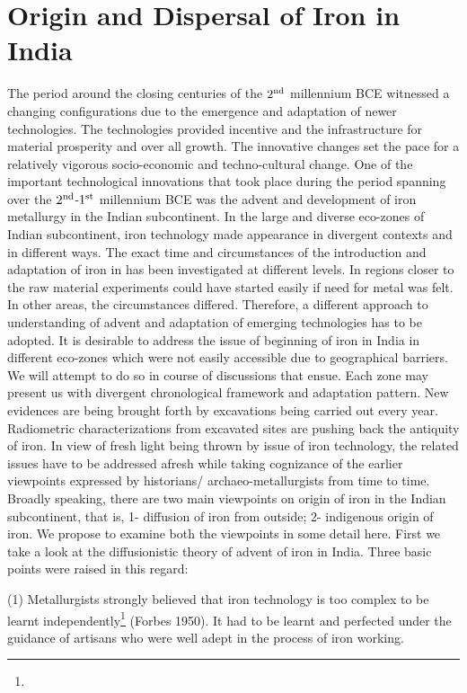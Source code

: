 \chapter{Origin and Dispersal of Iron in India}\label{chapter3}

The period around the closing centuries of the $2^{\rm nd}$ millennium BCE witnessed a changing configurations due to the emergence and adaptation of newer technologies. The technologies provided incentive and the infrastructure for material prosperity and over all growth. The innovative changes set the pace for a relatively vigorous socio-economic and techno-cultural change. One of the important technological innovations that took place during the period spanning over the $2^{\rm nd}$-$1^{\rm st}$ millennium BCE was the advent and development of iron metallurgy in the Indian subcontinent. In the large and diverse eco-zones of Indian subcontinent, iron technology made appearance in divergent contexts and in different ways. The exact time and circumstances of the introduction and adaptation of iron in has been investigated at different levels. In regions closer to the raw material experiments could have started easily if need for metal was felt. In other areas, the circumstances differed. Therefore, a different approach to understanding of advent and adaptation of emerging technologies has to be adopted. It is desirable to address the issue of beginning of iron in India in different eco-zones which were not easily accessible due to geographical barriers. We will attempt to do so in course of discussions that ensue. Each zone may present us with divergent chronological framework and adaptation pattern. New evidences are being brought forth by excavations being carried out every year. Radiometric characterizations from excavated sites are pushing back the antiquity of iron. In view of fresh light being thrown by issue of iron technology, the related issues have to be addressed afresh while taking cognizance of the earlier viewpoints expressed by historians/ archaeo-metallurgists from time to time. Broadly speaking, there are two main viewpoints on origin of iron in the Indian subcontinent, that is, 1- diffusion of iron from outside; 2- indigenous origin of iron. We propose to examine both the viewpoints in some detail here.  First we take a look at the diffusionistic theory of advent of iron in India. Three basic points were raised in this regard:

 (1) Metallurgists strongly believed that iron technology is too complex to be learnt independently\footnote{} (Forbes 1950). It had to be learnt and perfected under the guidance of artisans who were well adept in the process of iron working.
 
